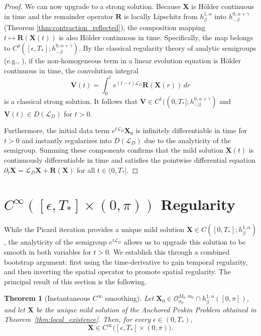 \documentclass{amsart}
\newtheorem{theorem}{Theorem}[section]
\begin{document}
\begin{proof}
We can now upgrade to a strong solution. Because $\mathbf{X}$ is Hölder continuous in time and the remainder operator $\mathbf{R}$ is locally Lipschitz from $h^{1,\alpha}_\beta$ into $h^{0,\alpha+\gamma}_{-\beta}$ (Theorem \ref{thm:contraction_reflected}), the composition mapping $t \mapsto \mathbf{R}(\mathbf{X}(t))$ is also Hölder continuous in time. Specifically, the map belongs to $C^\delta([\epsilon, T_*]; h^{0,\alpha+\gamma}_{-\beta})$.
By the classical regularity theory of analytic semigroups (e.g., \cite[Theorem 4.3.1]{lunardi1995analytic}), if the non-homogeneous term in a linear evolution equation is Hölder continuous in time, the convolution integral
\[
\mathbf{V}(t) = \int_0^t e^{(t-r)\mathcal{L}_D} \mathbf{R}(\mathbf{X}(r)) \, dr
\]
is a classical strong solution. It follows that $\mathbf{V} \in C^1((0,T_*]; h^{0,\alpha+\gamma}_{-\beta})$ and $\mathbf{V}(t) \in D(\mathcal{L}_D)$ for $t > 0$. 

Furthermore, the initial data term $e^{t\mathcal{L}_D} \mathbf{X}_0$ is infinitely differentiable in time for $t>0$ and instantly regularizes into $D(\mathcal{L}_D)$ due to the analyticity of the semigroup. Summing these components confirms that the mild solution $\mathbf{X}(t)$ is continuously differentiable in time and satisfies the pointwise differential equation $\partial_t \mathbf{X} = \mathcal{L}_D \mathbf{X} + \mathbf{R}(\mathbf{X})$ for all $t \in (0, T_*]$.
\end{proof}


\section{$C^\infty([\epsilon,T_*]\times (0,\pi))$ Regularity}

While the Picard iteration provides a unique mild solution $\mathbf{X} \in C([0,T_*]; h^{1,\alpha}_\beta)$, the analyticity of the semigroup $e^{t\mathcal{L}_D}$ allows us to upgrade this solution to be smooth in both variables for $t > 0$. We establish this through a combined bootstrap argument: first using the time-derivative to gain temporal regularity, and then inverting the spatial operator to promote spatial regularity. The principal result of this section is the following.

\begin{theorem}[Instantaneous $C^\infty$ smoothing]\label{thm:infinite_smoothness_full}
Let $\mathbf{X}_0 \in \mathcal{O}^{M_0,m_0}_{\sigma_0} \cap h^{1,\alpha}_\beta([0,\pi])$, and let $\mathbf{X}$ be the unique mild solution of the Anchored Peskin Problem obtained in Theorem~\ref{thm:local_existence}. Then, for every $\epsilon \in (0, T_*)$,
\[
\mathbf{X} \in C^\infty\bigl([\epsilon, T_*] \times (0, \pi)\bigr).
\]
\end{theorem}
\end{document}
